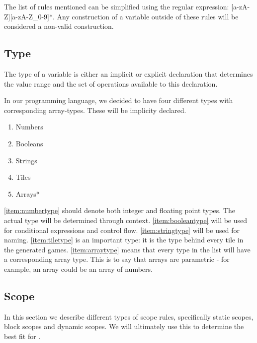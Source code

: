The list of rules mentioned can be simplified using the regular expression: [a-zA-Z][a-zA-Z\_0-9]*. Any construction of a variable outside of these rules will be considered
a non-valid construction.

\subsection{Type}

The type of a variable is either an implicit or explicit declaration that determines the value range and the set of operations available to this declaration.

In our programming language, we decided to have four different types with corresponding array-types. These will be implicity declared.

\begin{multicols}{3}
    \begin{enumerate}
        \item Numbers\label{item:numbertype}
        \item Booleans\label{item:booleantype}
        \item Strings\label{item:stringtype}
        \item Tiles\label{item:tiletype}
        \item Arrays*\label{item:arraytype}
    \end{enumerate}
\end{multicols}

\ref{item:numbertype} should denote both integer and floating point types. The actual type will be determined through context. \ref{item:booleantype} will be used for conditional expressions and control flow.
\ref{item:stringtype} will be used for naming.
\ref{item:tiletype} is an important type: it is the type behind every tile in the generated games.
\ref{item:arraytype} means that every type in the list will have a corresponding array type. This is to say that arrays are parametric - for example, an array could be an array of numbers.

\subsection{Scope}
In this section we describe different types of scope rules, specifically static scopes, block scopes and dynamic scopes.
We will ultimately use this to determine the best fit for \dazel{}.

